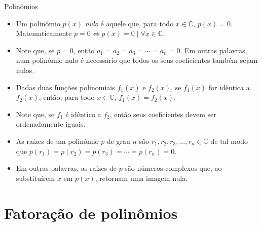 \documentclass[14pt, aspectratio=169]{beamer}
\newcommand{\C}{\mathbb{C}}
\newcommand{\skipframe}{\vspace{10.0cm}}
\begin{document}
\begin{frame}[allowframebreaks]{Polinômios}
\begin{itemize}
    \skipframe

    \item Um polinômio $p(x)$ \emph{nulo} é aquele que, para todo $x \in \C$, $p(x) = 0$. Matematicamente $p = 0 \Leftrightarrow p(x) = 0 \mid \forall x \in \C$.

    \item Note que, se $p = 0$, então $a_1 = a_2 = a_3 = \cdots = a_n = 0$. Em outras palavras, num polinômio nulo é necessário que todos os seus coeficientes também sejam nulos.

    \skipframe

    \item Dadas duas funções polinomiais $f_1(x)$ e $f_2(x)$, se $f_1(x)$ for idêntica a $f_2(x)$, então, para todo $x \in \C$, $f_1(x) = f_2(x)$.

    \item Note que, se $f_1$ é idêntico a $f_2$, então seus coeficientes devem ser ordenadamente iguais.

    \skipframe

    \item As raízes de um polinômio $p$ de grau $n$ são $r_1, r_2, r_3, \ldots, r_n \in \C$ de tal modo que $p(r_1) = p(r_2) = p(r_3) = \cdots = p(r_n) = 0$.

    \item Em outras palavras, as raízes de $p$ são números complexos que, ao substituírem $x$ em $p(x)$, retornam uma imagem nula.
\end{itemize}
    
\end{frame}

\section{Fatoração de polinômios}
\end{document}
